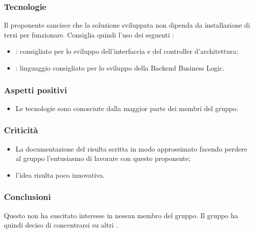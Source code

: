 \documentclass[]{article}
\begin{document}
            \subsubsection{Tecnologie}
            Il proponente sancisce che la soluzione sviluppata non dipenda da installazione di  terzi per funzionare.
            Consiglia quindi l'uso dei seguenti :
            \begin{itemize}
                \item {}:  consigliato per lo sviluppo dell'interfaccia e del controller d'architettura;
                \item {}: linguaggio consigliato per lo sviluppo della Backend Business Logic.
            \end{itemize}


            \subsubsection{Aspetti positivi}
            \begin{itemize}
                \item Le tecnologie sono conosciute dalla maggior parte dei membri del gruppo.
            \end{itemize}

            \subsubsection{Criticità}
            \begin{itemize}
                \item La documentazione del  risulta scritta in modo approssimato facendo perdere al gruppo l'entusiasmo di lavorare con questo proponente;
                \item l'idea risulta poco innovativa.
            \end{itemize}

            \subsubsection{Conclusioni}
            Questo  non ha suscitato interesse in nessun membro del gruppo. Il gruppo ha quindi deciso di concentrarsi su altri .
\end{document}

